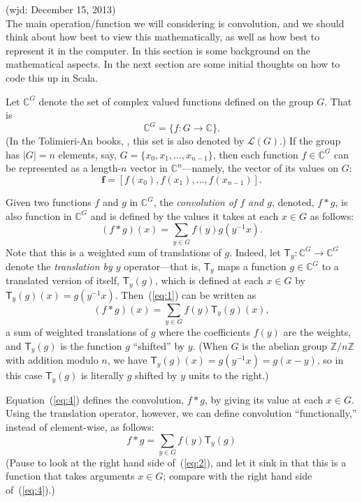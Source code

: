 \documentclass[11pt]{article}
\newcommand\C{\ensuremath{\mathbb{C}}}
\newcommand\Z{\ensuremath{\mathbb{Z}}}
\newcommand\vf{\ensuremath{\mathbf{f}}}
\newcommand\sL{\ensuremath{\mathcal{L}}}
\newcommand{\lt}[1]{\ensuremath{\mathsf{#1}}}
\newcommand{\T}{\lt{T}}       %
\begin{document}
  (wjd: December 15, 2013)\\[5pt]
The main operation/function we will considering is convolution, and we should
think about how best to view this mathematically, as well as how best to
represent it in the computer.  In this section is some background on the
mathematical aspects.  In the next section are some initial thoughts on how to
code this up in Scala.

Let $\C^G$ denote the set of complex valued functions defined on the group
$G$.  That is 
\[
\C^G = \{f : G\rightarrow \C \}.
\]
(In the Tolimieri-An books, \cite{Tolimieri:1998} \cite{Tolimieri:2003}, this set is also denoted by
$\sL(G)$.)  If the group has $|G| = n$ elements, say, 
$G = \{x_0, x_1, \dots, x_{n-1}\}$, 
then each function $f\in  \C^G$ can be represented as
a length-$n$ vector in $\C^n$---namely, the vector of its values on $G$:
\[
\vf = [f(x_0), f(x_1), \dots, f(x_{n-1})].
\]

Given two functions $f$ and $g$ in $\C^G$, the \emph{convolution of
$f$ and $g$}, denoted, $f*g$, is also function in $\C^G$ and is
defined by the values it takes at each $x\in G$ as follows:
\begin{equation}
\label{eq:1}  
(f*g)(x) = \sum_{y \in G} f(y) g(y^{-1}x).
\end{equation}
Note that this is a weighted sum of translations of $g$.
Indeed, let $\T_y: \C^G\rightarrow \C^G$ denote
the \emph{translation by $y$} operator---that is, $\T_y$ maps 
a function $g\in \C^G$ to a translated version of itself, $\T_y(g)$, which is defined at each 
$x \in G$ by $\T_y(g)(x) = g(y^{-1}x)$.
Then~(\ref{eq:1}) can be written as
\begin{equation}
\label{eq:4}  
(f*g)(x) = \sum_{y \in G} f(y) \T_y(g)(x),
\end{equation}
a sum of weighted translations of $g$ where 
the coefficients $f(y)$ are the weights, and 
$\T_y(g)$ is the function $g$ ``shifted'' by $y$. (When $G$ is the abelian
group $\Z/n\Z$ with addition modulo $n$, we have
$\T_y(g)(x) = g(y^{-1}x) = g(x-y)$, so in this case
$\T_y(g)$ is literally $g$ shifted by $y$ units to the right.)

Equation~(\ref{eq:4}) defines the convolution, $f * g$, by giving its
value at each $x\in G$. Using the 
translation operator, however, we can define convolution
 ``functionally,'' instead of element-wise, as follows:
\begin{equation}
\label{eq:2}  
f*g = \sum_{y \in G} f(y) \T_y(g)
\end{equation}
(Pause to look at the right hand side of~(\ref{eq:2}), and let it sink in that
this is a function that takes arguments $x\in G$; compare with the right
hand side of~(\ref{eq:4}).)
\end{document}
